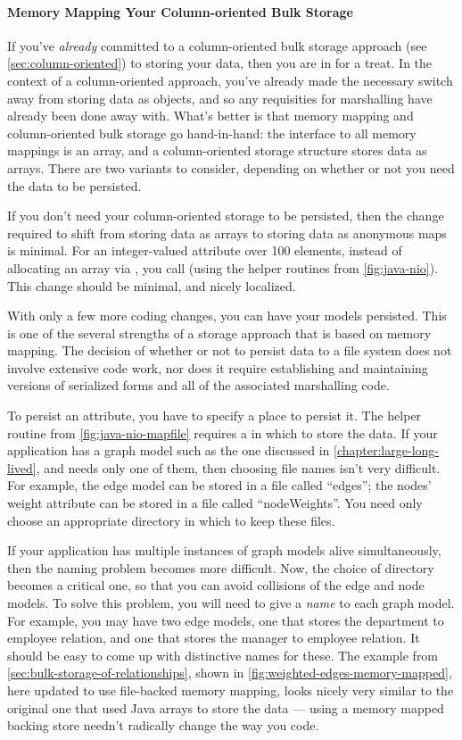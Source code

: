  
\paragraph{Memory Mapping Your Column-oriented Bulk Storage}
If you've \emph{already} committed to a column-oriented bulk storage approach
(see \autoref{sec:column-oriented}) to storing your data, then you are in for a
treat. In the context of a column-oriented approach, you've already made the
necessary switch away from storing data as objects, and so any requisities for
marshalling have already been done away with. What's better is that memory
mapping and column-oriented bulk storage go hand-in-hand: the interface to all
memory mappings is an array, and a column-oriented storage structure stores data
as arrays. There are two variants to consider, depending on whether or not you
need the data to be persisted. 

If you don't need your column-oriented storage to be persisted, then the change
required to shift from storing data as arrays to storing data as anonymous maps
is minimal. For an integer-valued attribute over 100 elements, instead of
allocating an array via , you call
 (using the helper routines from
\autoref{fig:java-nio}). This change should be minimal, and nicely localized.

With only a few more coding changes, you can have your models persisted. This is
one of the several strengths of a storage approach that is based on
memory mapping. The decision of whether or not to persist data to a
file system does not involve extensive code work, nor does it require
establishing and maintaining versions of serialized forms and all of the
associated marshalling code.

To persist an attribute, you have to specify a place to persist it. The helper
routine  from \autoref{fig:java-nio-mapfile} requires a
 in which to store the data. If your application has a graph model
such as the one discussed in \autoref{chapter:large-long-lived}, and needs only
one of them, then choosing file names isn't very difficult. For example, the
edge model can be stored in a file called ``edges''; the nodes' weight attribute
can be stored in a file called ``nodeWeights''. You need only choose an
appropriate directory in which to keep these files.

If your application has multiple instances of graph models alive simultaneously,
then the naming problem becomes more difficult. Now, the choice of directory
becomes a critical one, so that you can avoid collisions of the edge and node
models. To solve this problem, you will need to give a \emph{name} to each graph
model. For example, you may have two edge models, one that stores the department
to employee relation, and one that stores the manager to employee relation. It
should be easy to come up with distinctive names for these. The
 example from \autoref{sec:bulk-storage-of-relationships},
shown in \autoref{fig:weighted-edges-memory-mapped}, here updated to use
file-backed memory mapping, looks nicely very similar to the original one that
used Java arrays to store the data --- using a memory mapped backing store
needn't radically change the way you code.

